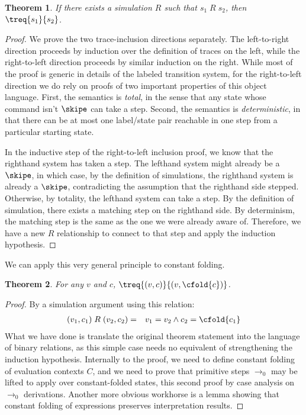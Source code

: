 \documentclass{amsbook}
\newtheorem{theorem}{Theorem}[chapter]
\theoremstyle{definition}
\theoremstyle{remark}
\numberwithin{section}{chapter}
\numberwithin{equation}{chapter}
\begin{document}
\begin{theorem}
  \label{simulation_ok}If there exists a simulation $R$ such that $s_1 \; R \; s_2$, then $\treq{s_1}{s_2}$.
\end{theorem}
\begin{proof}
  We prove the two trace-inclusion directions separately.
  The left-to-right direction proceeds by induction over the definition of traces on the left, while the right-to-left direction proceeds by similar induction on the right.
  While most of the proof is generic in details of the labeled transition system, for the right-to-left direction we do rely on proofs of two important properties of this object language.
  First, the semantics is \emph{total}, in the sense that any state whose command isn't $\skipe$ can take a step.
  Second, the semantics is \emph{deterministic}, in that there can be at most one label/state pair reachable in one step from a particular starting state.

  In the inductive step of the right-to-left inclusion proof, we know that the righthand system has taken a step.
  The lefthand system might already be a $\skipe$, in which case, by the definition of simulations, the righthand system is already a $\skipe$, contradicting the assumption that the righthand side stepped.
  Otherwise, by totality, the lefthand system can take a step.
  By the definition of simulation, there exists a matching step on the righthand side.
  By determinism, the matching step is the same as the one we were already aware of.
  Therefore, we have a new $R$ relationship to connect to that step and apply the induction hypothesis.
\end{proof}

We can apply this very general principle to constant folding.

\begin{theorem}
  \label{cfold_ok}For any $v$ and $c$, $\treq{(v, c)}{(v, \cfold{c})}$.
\end{theorem}
\begin{proof}
  By a simulation argument using this relation:
  \begin{eqnarray*}
    (v_1, c_1) \; R \; (v_2, c_2) &=& v_1 = v_2 \land c_2 = \cfold{c_1}
  \end{eqnarray*}
  What we have done is translate the original theorem statement into the language of binary relations, as this simple case needs no equivalent of strengthening the induction hypothesis.
  Internally to the proof, we need to define constant folding of evaluation contexts $C$, and we need to prove that primitive steps $\to_0$ may be lifted to apply over constant-folded states, this second proof by case analysis on $\to_0$ derivations.
  Another more obvious workhorse is a lemma showing that constant folding of expressions preserves interpretation results.
\end{proof}
\end{document}
